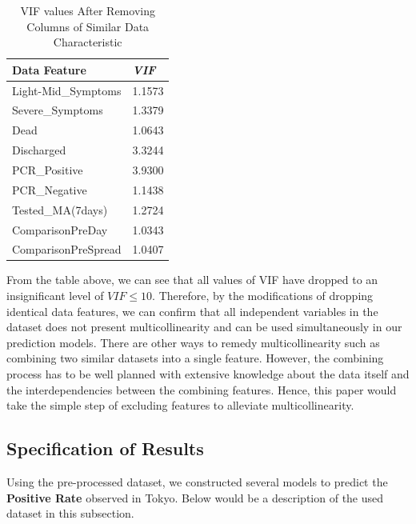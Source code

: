 \begin{table}[h]
\centering
\caption{\label{tab:VIF2nd}VIF values After Removing Columns of Similar Data Characteristic}
\begin{tabular}{ |p{5cm}||p{2cm}| }
 \hline
    Data Feature &  \textit{VIF}\\
 \hline
Light-Mid\_Symptoms & 1.1573 \\
Severe\_Symptoms & 1.3379 \\
Dead & 1.0643 \\
Discharged & 3.3244 \\
PCR\_Positive & 3.9300 \\
PCR\_Negative & 1.1438 \\
Tested\_MA(7days) & 1.2724 \\
ComparisonPreDay & 1.0343 \\
ComparisonPreSpread & 1.0407 \\
 \hline
\end{tabular}
\end{table}

From the table above, we can see that all values of VIF have dropped to an insignificant level of $VIF\leq10$.  Therefore, by the modifications of dropping identical data features, we can confirm that all independent variables in the dataset does not present multicollinearity and can be used simultaneously in our prediction models. There are other ways to remedy multicollinearity such as combining two similar datasets into a single feature. However, the combining process has to be well planned with extensive knowledge about the data itself and the interdependencies between the combining features. Hence, this paper would take the simple step of excluding features to alleviate multicollinearity.

\subsection{Specification of Results}
Using the pre-processed dataset, we constructed several models to predict the \textbf{Positive Rate} observed in Tokyo. Below would be a description of the used dataset in this subsection. 

